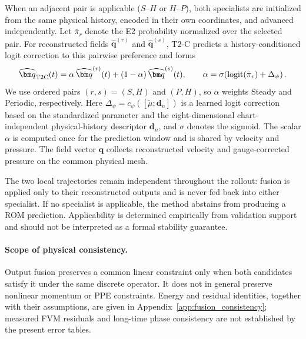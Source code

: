 When an adjacent pair is applicable ($S$--$H$ or $H$--$P$), both specialists are initialized from the same physical history, encoded in
their own coordinates, and advanced independently. Let $\bar\pi_r$ denote the E2 probability normalized over the selected pair. For reconstructed fields $\widehat{\bm q}^{(r)}$ and $\widehat{\bm q}^{(s)}$, T2-C predicts a history-conditioned logit correction to this pairwise preference and forms
\begin{equation}
  \widehat{\bm q}_{\rm T2C}(t)
  =\alpha\,\widehat{\bm q}^{(r)}(t)
  +(1-\alpha)\,\widehat{\bm q}^{(s)}(t),
  \qquad
  \alpha=
  \sigma\!\left(
  \operatorname{logit}(\bar\pi_r)+\Delta_\psi
  \right).
  \label{eq:main_t2c}
\end{equation}
We use ordered pairs $(r,s)=(S,H)$ and $(P,H)$, so $\alpha$ weights Steady and Periodic, respectively. Here $\Delta_\psi=c_\psi([\widetilde\mu;\bm d_n])$ is a learned logit correction based on the standardized parameter and the eight-dimensional chart-independent physical-history descriptor $\bm d_n$, and $\sigma$ denotes the sigmoid. The scalar $\alpha$ is computed once for the prediction window and is shared by velocity and pressure. The field vector $\bm q$ collects reconstructed velocity and gauge-corrected pressure on the common physical mesh.

The two local trajectories remain independent throughout the rollout: fusion is applied only to their reconstructed outputs and is never fed back into either specialist. If no specialist is applicable, the method abstains from producing a ROM prediction. Applicability is determined empirically from validation support and should not be interpreted as a formal stability guarantee.


\paragraph{Scope of physical consistency.}
Output fusion preserves a common linear constraint only when both
candidates satisfy it under the same discrete operator. It does not in
general preserve nonlinear momentum or PPE constraints. Energy and
residual identities, together with their assumptions, are given in
Appendix~\ref{app:fusion_consistency}; measured FVM residuals and long-time
phase consistency are not established by the present error tables.
